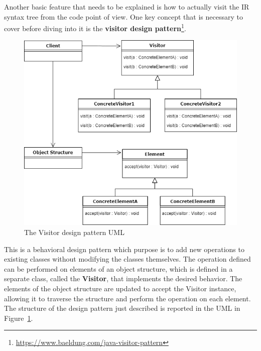 Another basic feature that needs to be explained is how to actually visit the IR syntax tree from the code point of view. One key concept that is necessary to cover before diving into it is the \textbf{visitor design pattern}\footnote{\url{https://www.baeldung.com/java-visitor-pattern}\label{visitor_pattern_footnote}}.
\begin{figure}[!ht]
    \centering
    \includegraphics[scale=0.6]{document/chapters/2-metaprogramming/images/visitor_pattern_uml.png}
    \caption{The Visitor design pattern UML}
    \label{fig:visitor_uml}
\end{figure}
This is a behavioral design pattern which purpose is to add new operations to existing classes without modifying the classes themselves.\newline
The operation defined can be performed on elements of an object structure, which is defined in a separate class, called the \textbf{Visitor}, that implements the desired behavior. The elements of the object structure are updated to accept the Visitor instance, allowing it to traverse the structure and perform the operation on each element. The structure of the design pattern just described is reported in the UML in Figure~\ref{fig:visitor_uml}.

